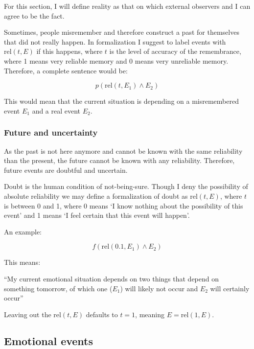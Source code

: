 \documentclass{scrartcl}
\begin{document}
For this section, I will define reality as that on which external observers and I can agree to be the fact.

Sometimes, people misremember and therefore construct a past for themselves that did not really happen. In formalization
I suggest to label events with $\mathrm{rel}(t, E)$ if this happens, where $t$ is the level of accuracy of the
remembrance, where 1 means very reliable memory and 0 means very unreliable memory. Therefore, a complete sentence would be:

\begin{equation} p \left( \textrm{rel}(t, E_1) \wedge E_2 \right) \end{equation}

This would mean that the current situation is depending on a misremembered event $E_1$ and a real event
$E_2$.

\subsubsection{Future and uncertainty}

As the past is not here anymore and cannot be known with the same reliability than the present, the future
cannot be known with any reliability. Therefore, future events are doubtful and uncertain. 

Doubt is the human condition of not-being-sure. Though I deny the possibility of absolute reliability we
may define a formalization of doubt as $\textrm{rel}(t, E)$, where $t$ is between 0 and 1, where 0 means
`I know nothing about the possibility of this event' and 1 means `I feel certain that this event will happen'.

An example:

\begin{equation} f \left( \textrm{rel}(0.1, E_1) \wedge E_2 \right) \end{equation}

This means:

``My current emotional situation depends on two things that depend on something tomorrow, of which one ($E_1$) will likely not
occur and $E_2$ will certainly occur''

Leaving out the $\textrm{rel}(t, E)$ defaults to $t = 1$, meaning $E = \textrm{rel}(1, E)$.

\subsection{Emotional events}
\end{document}
